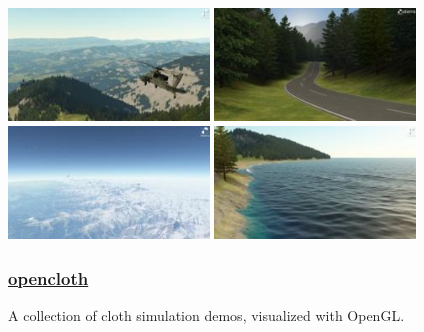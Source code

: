 \documentclass{scrartcl}
\numberwithin{figure}{subsection}
\begin{document}
\begin{center}
  \includegraphics[width=0.4\textwidth]{outerra1}
  \includegraphics[width=0.4\textwidth]{outerra2}
  \includegraphics[width=0.4\textwidth]{outerra3}
  \includegraphics[width=0.4\textwidth]{outerra4}
\end{center}

\subsubsection{\href{https://github.com/mmmovania/opencloth}{opencloth}}

A collection of cloth simulation demos, visualized with OpenGL.
\end{document}
